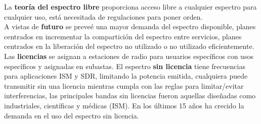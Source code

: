 \documentclass[10pt,portrait, twocolumn]{article}
\begin{document}
La \textbf{teoría del espectro libre} proporciona acceso libre a cualquier espectro para cualquier uso, está necesitada de regulaciones para poner orden.\\

A vistas de \textbf{futuro} se preveé una mayor demanda del espectro disponible, planes centrados en incrementar la compartición del espectro entre servicios, planes centrados en la liberación del espectro no utilizado o no utilizado eficientemente.\\

Las \textbf{licencias} se asignan a estaciones de radio para usuarios específicos con usos específicos y asignadas en subastas. El espectro \textbf{sin licencia} tiene frecuencias para aplicaciones ISM y SDR, limitando la potencia emitida, cualquiera puede transmitir sin una licencia mientras cumpla con las reglas para limitar/evitar interferencias, las principales bandas sin licencias fueron aquellas diseñadas como industriales, científicas y médicas (ISM). En los últimos 15 años ha crecido la demanda en el uso del espectro sin licencia.

\hrulefill
	
	
	




\end{document}
